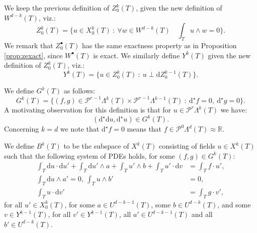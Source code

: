 \documentclass[10pt,a4paper]{article}
\newcommand{\rmd}{\mathrm{d}}
\newcommand{\bbR}{\mathbb{R}}
\newcommand{\calP}{\mathcal{P}}
\newcommand{\bs}{{\scriptscriptstyle{\bullet}}}
\newcommand{\Poly}{\calP}
\theoremstyle{remark}
\theoremstyle{definition}
\numberwithin{equation}{section}
\begin{document}
We keep the previous definition of $Z^k_0(T)$, given the new definition of $W^{d-k}(T)$, viz.:
\begin{equation}
Z^k_0(T)  = \{u \in X^k_0(T) \ : \ \forall w \in W^{d-k}(T) \quad \int_T u \wedge w = 0\}.
\end{equation}
We remark that $Z^\bs_0(T)$ has the same exactness property as in Proposition \ref{prop:zexact}, since $W^\bs(T)$ is exact. We similarly define $Y^k(T)$ given the new definition of $Z^k_0(T)$, viz.:
\begin{equation}
  Y^k(T) = \{ u \in Z^k_0(T) \ : \ u \perp \rmd Z^{k-1}_0(T) \}.
\end{equation}

We define $G^k(T)$ as follows:
\begin{equation}
  G^k(T) = \{ (f, g) \in \Poly^{r-1} \Lambda^{k}(T) \times \Poly^{r-1} \Lambda^{k-1}(T) \ : \ \rmd^\star f = 0,\ \rmd^\star g = 0\}.
\end{equation}
A motivating observation for this definition is that for $u \in \Poly^{r} \Lambda^{k}(T)$ we have:
\begin{equation}
  (\rmd^\star \rmd u, \rmd^\star u) \in G^k(T).
\end{equation}
Concerning $k = d$ we note that $\rmd^\star f = 0$ means that $f \in \Poly^0 \Lambda^d(T) \approx \bbR$.

  
We define $B^k(T)$ to be the subspace of $X^k(T)$ consisting of fields $u \in X^k(T)$ such that the following system of PDEs holds, for some $(f,g) \in G^k(T)$:
\begin{align}\label{eq:defApde}
  \int_T \rmd u \cdot \rmd u' + \int_T \rmd u' \wedge a + \int_T u' \wedge b + \int_T u' \cdot \rmd v & = \int_T f \cdot u',\\
  \int_T \rmd u \wedge a' =0 ,\ \int_T u \wedge b' & = 0 ,\\
  \int_T u \cdot \rmd v' & = \int_T g \cdot v',
\end{align}
for all $u' \in X^k_0(T)$, for some $a \in U^{d-k-1}(T)$, some $b \in U^{d-k}(T)$, and some $v \in Y^{k-1}(T)$,  for all $v' \in Y^{k-1}(T)$, all $a' \in U^{d-k-1}(T)$ and all $b' \in U^{d-k}(T)$.
\end{document}
